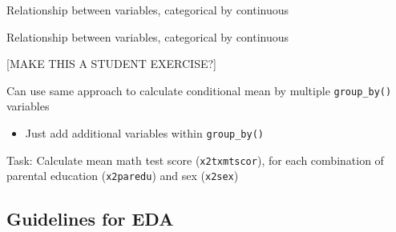 \documentclass[8pt,ignorenonframetext,dvipsnames]{beamer}
\newenvironment{Shaded}{\begin{snugshade}}{\end{snugshade}}
\newcommand{\KeywordTok}[1]{\textcolor[rgb]{0.13,0.29,0.53}{\textbf{#1}}}
\newcommand{\DataTypeTok}[1]{\textcolor[rgb]{0.13,0.29,0.53}{#1}}
\newcommand{\StringTok}[1]{\textcolor[rgb]{0.31,0.60,0.02}{#1}}
\newcommand{\OtherTok}[1]{\textcolor[rgb]{0.56,0.35,0.01}{#1}}
\newcommand{\OperatorTok}[1]{\textcolor[rgb]{0.81,0.36,0.00}{\textbf{#1}}}
\newcommand{\NormalTok}[1]{#1}
\providecommand{\tightlist}{%
  \setlength{\itemsep}{0pt}\setlength{\parskip}{0pt}}
\renewcommand{\textbf}[1]{{\color{darkgray}\bfseries\fontfamily{Montserrat-TOsF}#1}}
\begin{document}
\begin{frame}[fragile]{Relationship between variables, categorical by
continuous}
\end{frame}

\begin{frame}[fragile]{Relationship between variables, categorical by
continuous}

{[}MAKE THIS A STUDENT EXERCISE?{]}

Can use same approach to calculate conditional mean by multiple
\texttt{group\_by()} variables

\begin{itemize}
\tightlist
\item
  Just add additional variables within \texttt{group\_by()}
\end{itemize}

Task: Calculate mean math test score (\texttt{x2txmtscor}), for each
combination of parental education (\texttt{x2paredu}) and sex
(\texttt{x2sex})

\begin{Shaded}
\end{Shaded}

\end{frame}

\subsection{Guidelines for EDA}\label{guidelines-for-eda}
\end{document}
